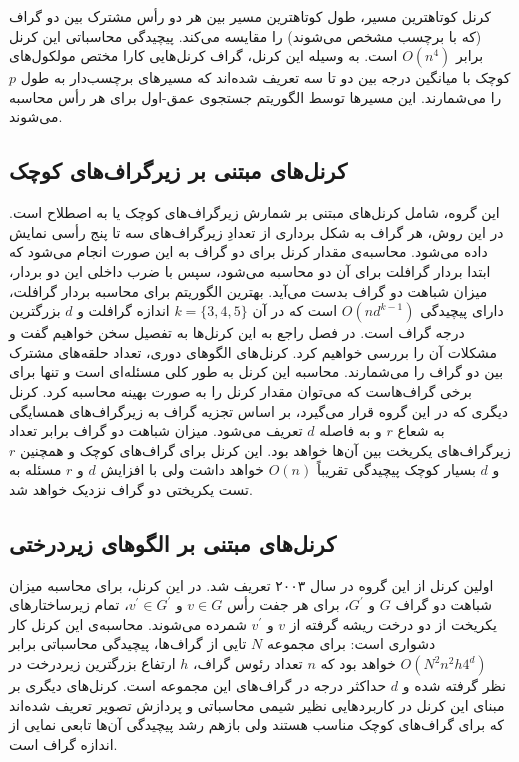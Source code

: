 کرنل کوتاهترین مسیر، طول کوتاهترین مسیر بین هر دو رأس مشترک بین دو گراف (که با برچسب مشخص می‌شوند) را مقایسه می‌کند. پیچیدگی محاسباتی این کرنل برابر $O(n^4)$ است. به وسیله این کرنل، گراف کرنل‌هایی کارا مختص مولکول‌های کوچک با میانگین درجه بین دو تا سه تعریف شده‌اند که مسیرهای برچسب‌دار به طول $p$ را می‌شمارند. این مسیر‌ها توسط الگوریتم جستجوی عمق-اول برای هر رأس محاسبه می‌شوند.

\subsection{کرنل‌های مبتنی بر زیرگراف‌های کوچک}\label{sec:subgraph-kernels}
این گروه، شامل کرنل‌های مبتنی بر شمارش زیرگراف‌های کوچک یا به اصطلاح  است. در این روش، هر گراف به شکل برداری از تعدادِ زیرگراف‌های سه تا پنج رأسی نمایش داده می‌شود. محاسبه‌ی مقدار کرنل برای دو گراف به این صورت انجام می‌شود که ابتدا بردار گرافلت برای آن دو محاسبه می‌شود، سپس با ضرب داخلی این دو بردار، میزان شباهت دو گراف بدست می‌آید. بهترین الگوریتم برای محاسبه بردار گرافلت، دارای پیچیدگی $O(nd^{k-1})$ است که در آن $k = \lbrace{3,4,5}\rbrace$ اندازه گرافلت و $d$ بزرگترین درجه گراف است. در فصل  راجع به این کرنل‌ها به تفصیل سخن خواهیم گفت و مشکلات آن‌ را بررسی خواهیم کرد.
کرنل‌های الگوهای دوری، تعداد حلقه‌های مشترک بین دو گراف را می‌شمارند. محاسبه این کرنل به طور کلی مسئله‌ای  است و تنها برای برخی گراف‌هاست که می‌توان مقدار کرنل را به صورت بهینه محاسبه کرد. کرنل دیگری که در این گروه قرار می‌گیرد، بر اساس تجزیه گراف به زیرگراف‌های همسایگی به شعاع $r$ و به فاصله $d$ تعریف می‌شود. میزان شباهت دو گراف برابر تعداد زیرگراف‌های یکریخت بین آن‌ها خواهد بود. این کرنل برای گراف‌های کوچک و همچنین $r$ و $d$ بسیار کوچک پیچیدگی تقریباً $O(n)$ خواهد داشت ولی با افزایش $d$ و $r$ مسئله به تست یکریختی دو گراف نزدیک خواهد شد.

\subsection{کرنل‌های مبتنی بر الگوهای زیردرختی}
اولین کرنل از این گروه در سال ۲۰۰۳ تعریف شد. در این کرنل، برای محاسبه میزان شباهت دو گراف $G$ و $G^\prime$، برای هر جفت رأس $v \in G$ و $v^\prime \in G^\prime$، تمام زیرساختارهای یکریخت از دو درخت ریشه گرفته از $v$ و $v^\prime$ شمرده می‌شوند. محاسبه‌ی این کرنل کار دشواری است: برای مجموعه $N$ تایی از گراف‌ها، پیچیدگی محاسباتی برابر $O(N^2n^2h4^d)$ خواهد بود که $n$ تعداد رئوس گراف، $h$ ارتفاع بزرگترین زیردرخت در نظر گرفته شده و $d$ حداکثر درجه در گراف‌های این مجموعه است. کرنل‌های دیگری بر مبنای این کرنل در کاربردهایی نظیر شیمی محاسباتی و پردازش تصویر تعریف شده‌اند که برای گراف‌های کوچک مناسب هستند ولی بازهم رشد پیچیدگی آن‌ها تابعی نمایی از اندازه گراف است.

